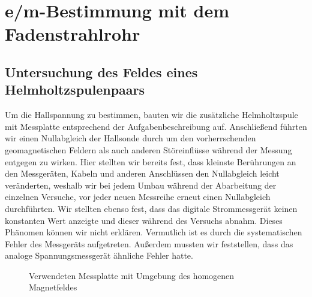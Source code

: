 \chapter{e/m-Bestimmung mit dem Fadenstrahlrohr}
\section{Untersuchung des Feldes eines Helmholtzspulenpaars}
Um die Hallspannung zu bestimmen, bauten wir die zusätzliche Helmholtzspule mit Messplatte entsprechend der Aufgabenbeschreibung auf. Anschließend führten wir einen Nullabgleich der Hallsonde durch um den vorherrschenden geomagnetischen Feldern als auch anderen Störeinflüsse während der Messung entgegen zu wirken. Hier stellten wir bereits fest, dass kleinste Berührungen an den Messgeräten, Kabeln und anderen Anschlüssen den Nullabgleich leicht veränderten, weshalb wir bei jedem Umbau während der Abarbeitung der einzelnen Versuche, vor jeder neuen Messreihe erneut einen Nullabgleich durchführten. Wir stellten ebenso fest, dass das digitale Strommessgerät keinen konstanten Wert anzeigte und dieser während des Versuchs abnahm. Dieses Phänomen können wir nicht erklären. Vermutlich ist es durch die systematischen Fehler des Messgeräts aufgetreten. Außerdem mussten wir feststellen, dass das analoge Spannungsmessgerät ähnliche Fehler hatte.   

\begin{figure}[hbtp]
\centering
{}
\caption{Verwendeten Messplatte mit Umgebung des homogenen Magnetfeldes}
\label{fig:MessPlatte}
\end{figure}

